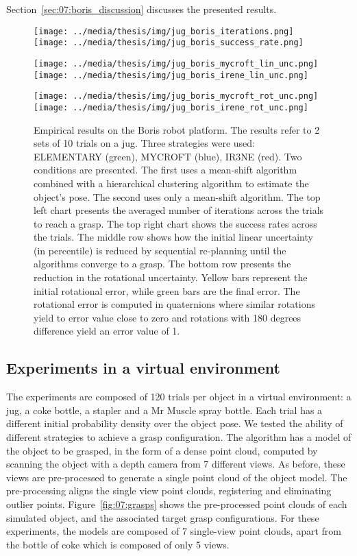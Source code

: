 Section~\ref{sec:07:boris_discussion} discusses the presented results. 

\begin{figure}[!ht]
\centerline{
\texttt{[image: ../media/thesis/img/jug\_boris\_iterations.png]}
\texttt{[image: ../media/thesis/img/jug\_boris\_success\_rate.png]}
}
\centerline{
\texttt{[image: ../media/thesis/img/jug\_boris\_mycroft\_lin\_unc.png]}
\texttt{[image: ../media/thesis/img/jug\_boris\_irene\_lin\_unc.png]}
}
\centerline{
\texttt{[image: ../media/thesis/img/jug\_boris\_mycroft\_rot\_unc.png]}
\texttt{[image: ../media/thesis/img/jug\_boris\_irene\_rot\_unc.png]}
}

\caption[Empirical results on Boris]{Empirical results on the Boris robot platform. The results refer to 2 sets of 10 trials on a jug. Three strategies were used: ELEMENTARY (green), MYCROFT (blue), IR3NE (red). Two conditions are presented. The first uses a mean-shift algorithm combined with a hierarchical clustering algorithm to estimate the object's pose. The second uses only a mean-shift algorithm. The top left chart presents the averaged number of iterations across the trials to reach a grasp. The top right chart shows the success rates across the trials. The middle row shows how the initial linear uncertainty (in percentile) is reduced by sequential re-planning until the algorithms converge to a grasp. The bottom row presents the reduction in the rotational uncertainty. Yellow bars represent the initial rotational error, while green bars are the final error. The rotational error is computed in quaternions where similar rotations yield to error value close to zero and rotations with 180 degrees difference yield an error value of 1.}
\label{fig:07:jug_boris_results}
\end{figure}


\subsection{Experiments in a virtual environment}\label{sec:07:simulated_results}

The experiments are composed of 120 trials per object in a virtual environment: a jug, a coke bottle, a stapler and a Mr Muscle spray bottle. Each trial has a different initial probability density over the object pose. We tested the ability of different strategies to achieve a grasp configuration. The algorithm has a model of the object to be grasped, in the form of a dense point cloud, computed by scanning the object with a depth camera from 7 different views. As before, these views are pre-processed to generate a single point cloud of the object model. The pre-processing aligns the single view point clouds, registering and eliminating outlier points. Figure~\ref{fig:07:grasps} shows the pre-processed point clouds of each simulated object, and the associated target grasp configurations. For these experiments, the models are composed of 7 single-view point clouds, apart from the bottle of coke which is composed of only 5 views. 

